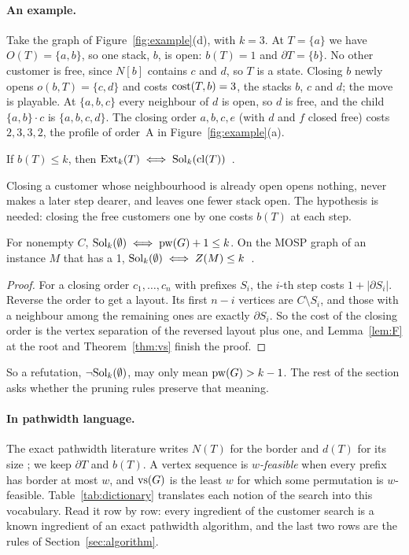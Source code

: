 \paragraph{An example.} Take the graph of Figure~\ref{fig:example}(d), with
$k=3$. At $T=\{a\}$ we have $O(T)=\{a,b\}$, so one stack, $b$, is open:
$b(T)=1$ and $\partial T=\{b\}$. No other customer is free, since $N[b]$
contains $c$ and $d$, so $T$ is a state. Closing $b$ newly opens
$o(b,T)=\{c,d\}$ and costs $\mathrm{cost}(T,b)=3$, the stacks $b$, $c$ and $d$; the
move is playable. At $\{a,b,c\}$ every neighbour of $d$ is open, so $d$ is
free, and the child $\{a,b\}\cdot c$ is $\{a,b,c,d\}$. The closing order
$a,b,c,e$ (with $d$ and $f$ closed free) costs $2,3,3,2$, the profile of
order~A in Figure~\ref{fig:example}(a).

\begin{lemma}\label{lem:F}
If $b(T)\le k$, then $\mathrm{Ext}_k(T)\iff\mathrm{Sol}_k(\mathrm{cl}(T))$~.
\end{lemma}
Closing a customer whose neighbourhood is already open opens nothing, never
makes a later step dearer, and leaves one fewer stack open. The hypothesis is
needed: closing the free customers one by one costs $b(T)$ at each step.

\begin{theorem}\label{thm:decides}
For nonempty $C$, $\mathrm{Sol}_k(\emptyset)\iff\mathrm{pw}(G)+1\le k$. On the MOSP graph of an
instance $M$ that has a 1, $\mathrm{Sol}_k(\emptyset)\iff Z(M)\le k$~.
\end{theorem}
\begin{proof}
For a closing order $c_1,\dots,c_n$ with prefixes $S_i$, the $i$-th step costs
$1+|\partial S_i|$. Reverse the order to get a layout. Its first $n-i$
vertices are $C\setminus S_i$, and those with a neighbour among the remaining
ones are exactly $\partial S_i$. So the cost of the closing order is the vertex
separation of the reversed layout plus one, and Lemma~\ref{lem:F} at the root
and Theorem~\ref{thm:vs} finish the proof.
\end{proof}

So a refutation, $\neg\mathrm{Sol}_k(\emptyset)$, may only mean $\mathrm{pw}(G)>k-1$. The rest
of the section asks whether the pruning rules preserve that meaning.

\paragraph{In pathwidth language.} The exact pathwidth literature writes
$N(T)$ for the border and $d(T)$ for its size
\citep[p.~390]{KobayashiKomuroTamaki2014}; we keep $\partial T$ and $b(T)$. A
vertex sequence is \emph{$w$-feasible} when every prefix has border at most
$w$, and $\mathrm{vs}(G)$ is the least $w$ for which some permutation is $w$-feasible.
Table~\ref{tab:dictionary} translates each notion of the search into this
vocabulary. Read it row by row: every ingredient of the customer search is a
known ingredient of an exact pathwidth algorithm, and the last two rows are
the rules of Section~\ref{sec:algorithm}.

